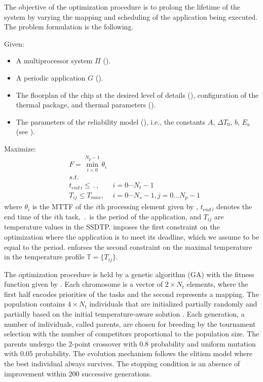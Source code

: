 The objective of the optimization procedure is to prolong the lifetime of the system by varying the mapping and scheduling of the application being executed. The problem formulation is the following.

Given:

\begin{itemize}
  \item A multiprocessor system $\Pi$ ().
  \item A periodic application $G$ ().
  \item The floorplan of the chip at the desired level of details (), configuration of the thermal package, and thermal parameters ().
  \item The parameters of the reliability model (), i.e., the constants $A$, $\Delta T_0$, $b$, $E_a$ (see ).
\end{itemize}

Maximize:
\begin{align}
  & F = \min_{i = 0}^{N_p - 1} \theta_i \label{eq:fitness-function} \\
  & s.t. \nonumber \\
  & t_{end \: i} \leq \period, & i = 0 \cdots N_t - 1 \label{eq:deadline} \\
  & T_{ij} \leq T_{max},       & i = 0 \cdots N_s - 1, j = 0 \dots N_p - 1 \label{eq:t-max}
\end{align}
where $\theta_i$ is the MTTF of the $i$th processing element given by , $t_{end \: i}$ denotes the end time of the $i$th task, $\period$ is the period of the application, and $T_{ij}$ are temperature values in the SSDTP.  imposes the first constraint on the optimization where the application is to meet its deadline, which we assume to be equal to the period.  enforses the second constraint on the maximal temperature in the temperature profile $\mathbb{T} = \{ T_{ij} \}$.

The optimization procedure is held by a genetic algorithm (GA) \cite{schmitz2004} with the fitness function given by . Each chromosome is a vector of $2 \times N_t$ elements, where the first half encodes priorities of the tasks and the second represents a mapping. The population contains $4 \times N_t$ individuals that are initialized partially randomly and partially based on the initial temperature-aware solution \cite{xie2006}. Each generation, a number of individuals, called parents, are chosen for breeding by the tournament selection with the number of competitors proportional to the population size. The parents undergo the 2-point crossover with $0.8$ probability and uniform mutation with $0.05$ probability. The evolution mechanism follows the elitism model where the best individual always survives. The stopping condition is an absence of improvement within $200$ successive generations.

